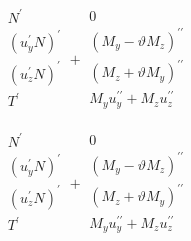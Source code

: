 $$
\begin{array}{c}
N^{\prime} \\
(u_y^{\prime} N)^{\prime} \\ %
(u_z^{\prime} N)^{\prime} \\ %
T^{\prime} \\
\end{array}
+\begin{array}{c} 
0 \\
( M_y-\vartheta M_z)^{\prime\prime} \\ %
( M_z+\vartheta M_y)^{\prime\prime} \\ %
M_y u_y^{\prime\prime} + M_z u_z^{\prime\prime}
\end{array}
$$


$$
\begin{array}{c}
N^{\prime} \\
(u_y^{\prime} N)^{\prime} \\ %
(u_z^{\prime} N)^{\prime} \\ %
T^{\prime} \\
\end{array}
+\begin{array}{c} 
0 \\
( M_y-\vartheta M_z)^{\prime\prime} \\ %
( M_z+\vartheta M_y)^{\prime\prime} \\ %
M_y u_y^{\prime\prime} + M_z u_z^{\prime\prime}
\end{array}
$$